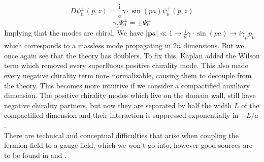 \documentclass[a4paper,10pt]{book}
\begin{document}
\begin{equation}
D\psi_{0}^{\pm}(p, z)=\frac{\mathrm{i}}{a} \gamma \cdot \sin (p a)\psi_{0}^{+}(p, z)
\end{equation}
\begin{equation}
\gamma_{5} \Psi_{0}^{\pm}=\pm \Psi_{0}^{\pm}
\end{equation}
Implying that the modes are chiral.
We have $|\mathbf{p}a|\ll 1 \longrightarrow \frac{\mathrm{i}}{a} \gamma \cdot \sin (p a)\rightarrow i\gamma_\mu p_\mu$ which corresponds to a massless mode propagating in $2n$ dimensions. But we once again see that the theory has doublers. To fix this, Kaplan added the Wilson term which removed every superfluous positive chirality mode. This also made every negative chirality term non- normalizable, causing them to decouple from the theory. This becomes more intuitive if we consider a compactified auxiliary dimension. The positive chirality modes which live on the domain wall, still have negative chirality partners, but now they are separated by half the width $L$ of the compactified dimension and their interaction is suppressed exponentially in $-L/a$.\\There are technical and conceptual difficulties that arise when coupling the fermion field to a gauge field, which we won't go into, however good sources are to be found in \cite{KaplanDavidB1992Amfs} and \cite{TONG_LN}.
\end{document}
